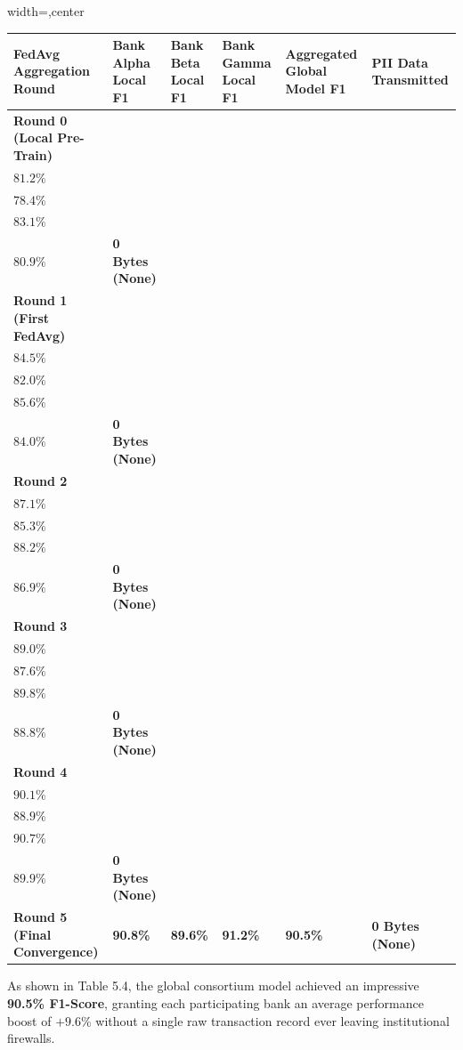 \documentclass[12pt,a4paper,oneside]{report}
\begin{document}
\begin{table}[H]
\centering
\footnotesize
\begin{adjustbox}{width=\textwidth,center}
\begin{tabular}{| l | l | l | l | l | l |}
\hline
\rowcolor{tableheader} \textbf{FedAvg Aggregation Round} & \textbf{Bank Alpha Local F1} & \textbf{Bank Beta Local F1} & \textbf{Bank Gamma Local F1} & \textbf{Aggregated Global Model F1} & \textbf{PII Data Transmitted} \\ \hline
\textbf{Round 0 (Local Pre-Train)} & \\$81.2\%$ & \\$78.4\%$ & \\$83.1\%$ & \\$80.9\%$ & \textbf{0 Bytes (None)} \\ \hline
\rowcolor{tablealt} \textbf{Round 1 (First FedAvg)} & \\$84.5\%$ & \\$82.0\%$ & \\$85.6\%$ & \\$84.0\%$ & \textbf{0 Bytes (None)} \\ \hline
\textbf{Round 2} & \\$87.1\%$ & \\$85.3\%$ & \\$88.2\%$ & \\$86.9\%$ & \textbf{0 Bytes (None)} \\ \hline
\rowcolor{tablealt} \textbf{Round 3} & \\$89.0\%$ & \\$87.6\%$ & \\$89.8\%$ & \\$88.8\%$ & \textbf{0 Bytes (None)} \\ \hline
\textbf{Round 4} & \\$90.1\%$ & \\$88.9\%$ & \\$90.7\%$ & \\$89.9\%$ & \textbf{0 Bytes (None)} \\ \hline
\rowcolor{tablealt} \textbf{Round 5 (Final Convergence)} & \textbf{90.8\%} & \textbf{89.6\%} & \textbf{91.2\%} & \textbf{90.5\%} & \textbf{0 Bytes (None)} \\ \hline
\end{tabular}
\end{adjustbox}
\end{table}

As shown in Table 5.4, the global consortium model achieved an impressive \textbf{90.5\% F1-Score}, granting each participating bank an average performance boost of $+9.6\%$ without a single raw transaction record ever leaving institutional firewalls.
\end{document}

